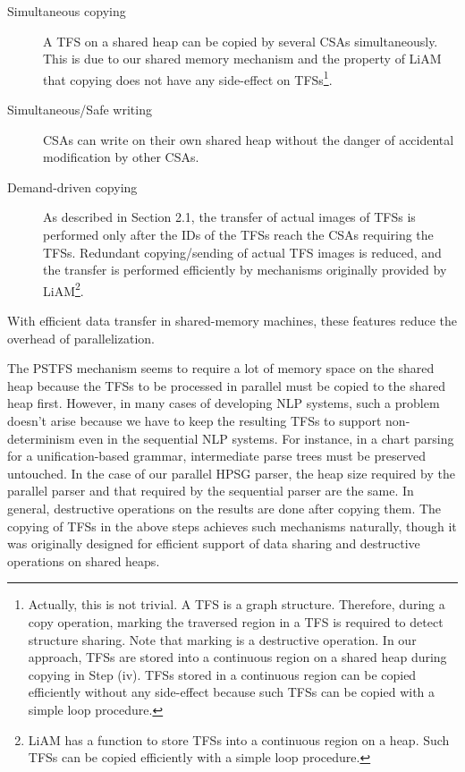 \begin{description}

\item[Simultaneous copying] A TFS on a shared heap can be copied by
several CSAs simultaneously. This is due to our shared memory
mechanism and the property of LiAM that copying does not have any
side-effect on TFSs\footnote{Actually, this is not trivial.  A TFS is
a graph structure.  Therefore, during a copy operation, marking the
traversed region in a TFS is required to detect structure sharing.
Note that marking is a destructive operation.  In our approach, TFSs
are stored into a continuous region on a shared heap during copying in
Step (iv). TFSs stored in a continuous region can be copied
efficiently without any side-effect because such TFSs can be copied
with a simple loop procedure.}.
\item[Simultaneous/Safe writing] CSAs can write on their own shared
heap without the danger of accidental modification by other CSAs.
\item[Demand-driven copying] As described in Section 2.1, the transfer
of actual images of TFSs is performed only after the IDs of the TFSs
reach the CSAs requiring the TFSs.  Redundant copying/sending of
actual TFS images is reduced, and the transfer is performed
efficiently by mechanisms originally provided by LiAM\footnote{LiAM
has a function to store TFSs into a continuous region on a heap.
Such TFSs can be copied efficiently with a simple loop procedure.}.
\end{description}

With efficient data transfer in shared-memory machines,
these features reduce the overhead of parallelization.


  The PSTFS mechanism seems to require a lot of memory space on the
shared heap because the TFSs to be processed in parallel must be
copied to the shared heap first.  However, in many cases of developing
NLP systems, such a problem doesn't arise because we have to keep the
resulting TFSs to support non-determinism even in the sequential NLP
systems.  For instance, in a chart parsing for a unification-based
grammar, intermediate parse trees must be preserved untouched.  In the
case of our parallel HPSG parser, the heap size required by the
parallel parser and that required by the sequential parser are the
same.  In general, destructive operations on the results are done
after copying them.  The copying of TFSs in the above steps achieves
such mechanisms naturally, though it was originally designed for
efficient support of data sharing and destructive operations on shared
heaps.

